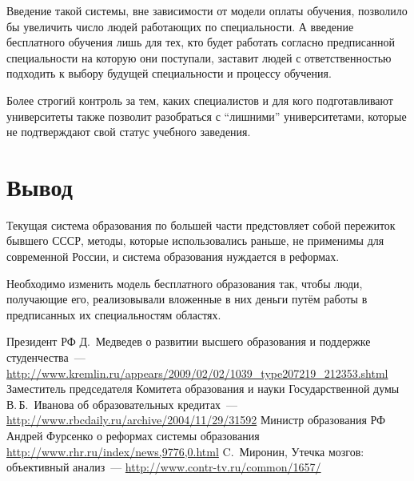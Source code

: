 \documentclass[10pt,a4paper,titlepage]{article}
\begin{document}
Введение такой системы, вне зависимости от модели оплаты обучения, позволило бы увеличить число людей работающих по специальности.
А введение бесплатного обучения лишь для тех, кто будет работать согласно предписанной специальности на которую они поступали,
заставит людей с ответственностью подходить к выбору будущей специальности и процессу обучения.

Более строгий контроль за тем, каких специалистов и для кого подготавливают университеты также позволит разобраться 
с ``лишними'' университетами, которые не подтверждают свой статус учебного заведения.

\section*{Вывод}
Текущая система образования по большей части предстовляет собой пережиток бывшего СССР, 
методы, которые использовались раньше, не применимы для современной России, 
и система образования нуждается в реформах.

Необходимо изменить модель бесплатного образования так, чтобы люди, получающие его, 
реализовывали вложенные в них деньги путём работы в предписанных их специальностям областях.

\pagebreak
\begin{thebibliography}{99}
    Президент РФ Д.~Медведев о развитии высшего образования и поддержке студенчества~---
      \url{http://www.kremlin.ru/appears/2009/02/02/1039_type207219_212353.shtml}
    Заместитель председателя Комитета образования и науки Государственной думы В.\,Б.~Иванова об образовательных кредитах~---
      \url{http://www.rbcdaily.ru/archive/2004/11/29/31592}
    Министр образования РФ Андрей Фурсенко о реформах системы образования
      \url{http://www.rhr.ru/index/news,9776,0.html}
    C.~Миронин, Утечка мозгов: объективный анализ~--- \url{http://www.contr-tv.ru/common/1657/}
\end{thebibliography}
\end{document}
